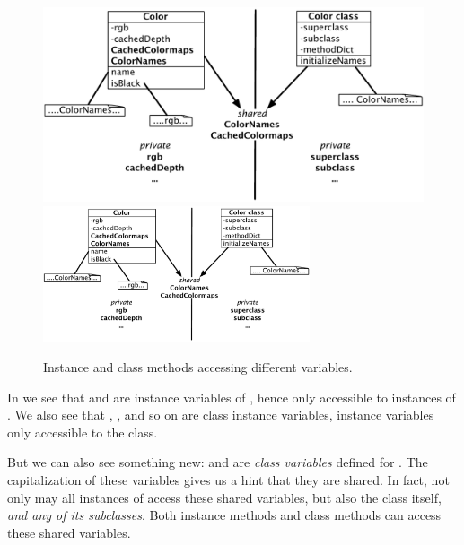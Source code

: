 \documentclass[a4paper,10pt,twoside]{book}
\begin{document}
\begin{figure}[htb]
\begin{center}
\ifluluelse
	{\includegraphics[width=\textwidth]{privateSharedVarColor}}
	{\includegraphics[width=0.7\textwidth]{privateSharedVarColor}}
\caption{Instance and class methods accessing different 
variables.\label{fig:privateSharedVar}}
\end{center}
\end{figure}

In  we see that  and  are instance variables of , hence only accessible to instances of .
We also see that , ,  and so on are class instance variables, \ie instance variables only accessible to the  class.

But we can also see something new:  and  are \emph{class variables} defined for .
The capitalization of these variables gives us a hint that they are shared.
In fact, not only may all instances of  access these shared variables, but also the  class itself, \emph{and any of its subclasses}.
Both instance methods and class methods can access these shared variables.

\end{document}
